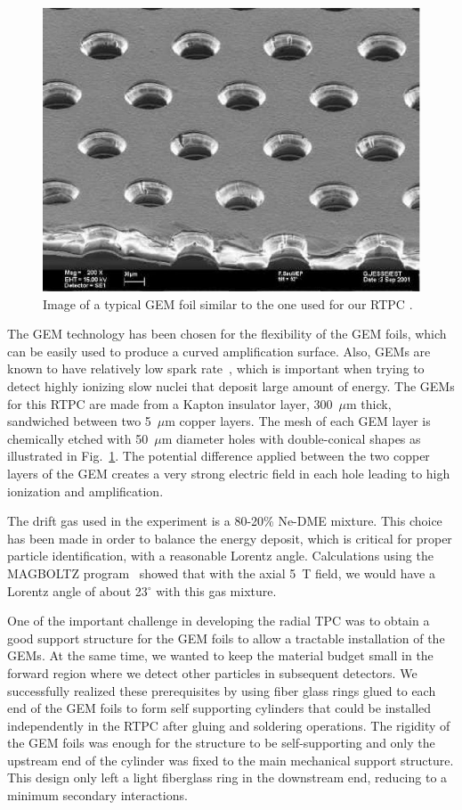 \documentclass[preprint,5p]{elsarticle}
\begin{document}
\begin{figure}[tbp]
\centering
\includegraphics[scale=0.70]{fig/GEM_photo.jpg}
\caption{Image of a typical GEM foil similar to the one used for our RTPC 
\cite{GEM_ref_pic}.} 
   \label{fig:GEMs}
\end{figure}

The GEM technology has been chosen for the flexibility of the GEM foils,
which can be easily used to produce a curved amplification surface. Also, 
GEMs are known to have relatively low spark rate~\cite{GEM_ref}, which 
is important when trying to detect 
highly ionizing slow nuclei that deposit large amount of energy. The GEMs for 
this RTPC are made from a Kapton insulator layer, 300~$\mu$m 
thick, sandwiched between two 5~$\mu$m copper layers. The mesh of each GEM 
layer is chemically etched with 50~$\mu$m diameter holes with double-conical 
shapes as illustrated in Fig.~\ref{fig:GEMs}. The potential difference 
applied between the two copper layers of the GEM creates a very strong 
electric field in each hole leading to high ionization and amplification. 

The drift gas used in the experiment is a 80-20\% Ne-DME mixture. This choice 
has been made in order to balance the energy deposit, which is critical
for proper particle identification, with a reasonable
Lorentz angle. Calculations using the MAGBOLTZ program~\cite{MAGBOLTZ} 
showed that with the axial 5~T field, we would have a Lorentz angle of 
about 23$^\circ$ with this gas mixture.

One of the important challenge in developing the radial TPC was to obtain a 
good support structure for the GEM foils to allow a tractable 
installation of the GEMs. At the same time, we wanted to 
keep the material budget small in the forward region where we detect other 
particles in subsequent detectors. We successfully realized these prerequisites 
by using fiber glass rings glued to each end of the GEM foils to form self 
supporting cylinders that could be installed independently in the RTPC after 
gluing and soldering operations. The rigidity of the GEM foils was enough
for the structure to be self-supporting and only the upstream end of the cylinder 
was fixed to the main mechanical support structure. This design only left a 
light fiberglass ring in the downstream end, reducing to a minimum secondary 
interactions.
\end{document}
